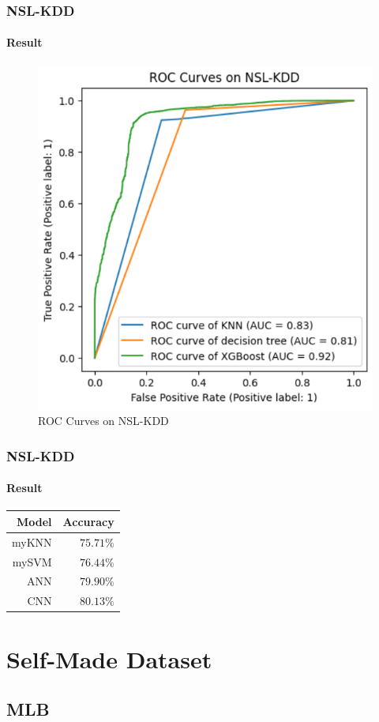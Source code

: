 \documentclass[
	11pt, %
	aspectratio=169, %
]{beamer}
\begin{document}
\begin{frame}
	\frametitle{NSL-KDD}
	\framesubtitle{Result}

	\begin{figure}
		\includegraphics[width=0.35\linewidth]{roc_curve.png}
		\caption{ROC Curves on NSL-KDD}
	\end{figure}
\end{frame}

\begin{frame}
	\frametitle{NSL-KDD}
	\framesubtitle{Result}

	\begin{center}
		\begin{tabular}{|rr|} 
			\hline
			Model&Accuracy\\          
			\hline                
			myKNN & $75.71\%$\\
			mySVM & $76.44\%$\\
			ANN \cite{ingre2015performance} & $79.90\%$\\
			CNN \cite{ding2018intrusion}& $80.13\%$\\
			\hline
		\end{tabular}
	\end{center}
\end{frame}

\section{Self-Made Dataset}
\subsection{MLB}
\end{document}

